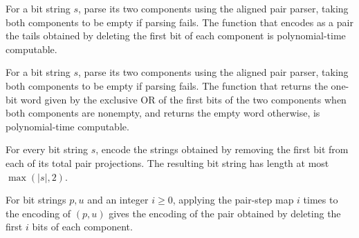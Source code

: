 \begin{theorem}
\label{Complexity.polyTimeComputable_xorPairStep}
\leanok
{}
For a bit string $s$, parse its two components using the aligned pair parser, taking
both components to be empty if parsing fails. The function that encodes as a pair the
tails obtained by deleting the first bit of each component is polynomial-time
computable.
\end{theorem}

\begin{theorem}
\label{Complexity.polyTimeComputable_xorPairEmit}
\leanok
{}
For a bit string $s$, parse its two components using the aligned pair parser, taking
both components to be empty if parsing fails. The function that returns the one-bit word
given by the exclusive OR of the first bits of the two components when both components
are nonempty, and returns the empty word otherwise, is polynomial-time computable.
\end{theorem}

\begin{theorem}
\label{Complexity.length_xorPairStep_le}
\leanok
{}
For every bit string $s$, encode the strings obtained by removing the first bit from
each of its total pair projections. The resulting bit string has length at most
$\max(|s|,2)$.
\end{theorem}

\begin{theorem}
\label{Complexity.xorPairStep_orbit}
\leanok
{}
For bit strings $p,u$ and an integer $i\ge 0$, applying the pair-step map $i$ times to
the encoding of $(p,u)$ gives the encoding of the pair obtained by deleting the first
$i$ bits of each component.
\end{theorem}

